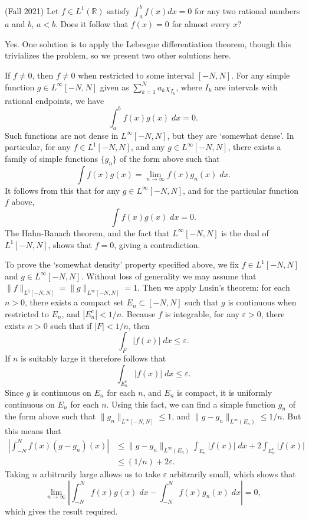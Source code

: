 \documentclass[answers]{exam}
\theoremstyle{problemstyle}
\newcommand{\1}[1]{\textbf{1}_{\left[#1\right]}} %
\begin{document}
\begin{questions}
\question (Fall 2021) Let $f\in L^1(\mathbb{R})$  satisfy $\int_{a}^{b}f(x)dx=0$
for any two rational numbers $a$ and $b$, $a<b$. Does it follow that $f(x)=0$
for almost every $x$?

\begin{solution}
	Yes. One solution is to apply the Lebesgue differentiation theorem, though this trivializes the problem, so we present two other solutions here.

	If $f \neq 0$, then $f \neq 0$ when restricted to some interval $[-N,N]$. For any simple function $g \in L^\infty[-N,N]$ given as $\sum_{k = 1}^N a_k \chi_{I_k}$, where $I_k$ are intervals with rational endpoints, we have
	\[ \int_a^b f(x) g(x)\; dx = 0. \]
	Such functions are not dense in $L^\infty[-N,N]$, but they are `somewhat dense'. In particular, for any $f \in L^1[-N,N]$, and any $g \in L^\infty[-N,N]$, there exists a family of simple functions $\{ g_n \}$ of the form above such that
	\[ \int f(x) g(x) = \lim_{n \to \infty} f(x) g_n(x)\; dx. \]
	It follows from this that for any $g \in L^\infty[-N,N]$, and for the particular function $f$ above,
	\[ \int f(x) g(x)\; dx = 0. \]
	The Hahn-Banach theorem, and the fact that $L^\infty[-N,N]$ is the dual of $L^1[-N,N]$, shows that $f = 0$, giving a contradiction.

	To prove the `somewhat density' property specified above, we fix $f \in L^1[-N,N]$ and $g \in L^\infty[-N,N]$. Without loss of generality we may assume that $\| f \|_{L^1[-N,N]} = \| g \|_{L^\infty[-N,N]} = 1$. Then we apply Lusin's theorem: for each $n > 0$, there exists a compact set $E_n \subset [-N,N]$ such that $g$ is continuous when restricted to $E_n$, and $|E_n^c| < 1/n$. Because $f$ is integrable, for any $\varepsilon > 0$, there exists $n > 0$ such that if $|F| < 1/n$, then
	\[ \int_{F} |f(x)|\; dx \leq \varepsilon. \]
	If $n$ is suitably large it therefore follows that
	\[ \int_{E_n^c} |f(x)|\; dx \leq \varepsilon. \]
	Since $g$ is continuous on $E_n$ for each $n$, and $E_n$ is compact, it is uniformly continuous on $E_n$ for each $n$. Using this fact, we can find a simple function $g_n$ of the form above such that $\| g_n \|_{L^\infty[-N,N]} \leq 1$, and $\| g - g_n \|_{L^\infty(E_n)} \leq 1/n$. But this means that 
	\begin{align*}
		\left| \int_{-N}^N f(x) (g - g_n)(x) \right| &\leq \| g - g_n \|_{L^\infty(E_n)} \int_{E_n} |f(x)|\; dx + 2 \int_{E_n^c} |f(x)|\\
		&\leq (1/n) + 2 \varepsilon.
	\end{align*}
	Taking $n$ arbitrarily large allows us to take $\varepsilon$ arbitrarily small, which shows that
	\[ \lim_{n \to \infty} \left| \int_{-N}^N f(x) g(x)\; dx - \int_{-N}^N f(x) g_n(x)\; dx \right| = 0, \]
	which gives the result required.


\end{solution}
\end{questions}
\end{document}

